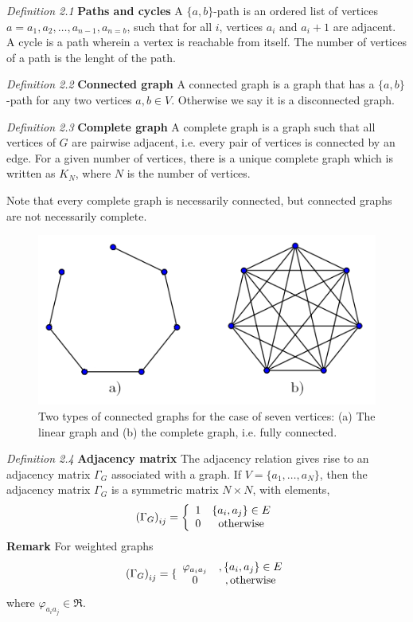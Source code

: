 \documentclass[10pt,a4paper]{book}
\numberwithin{equation}{chapter}
\numberwithin{figure}{chapter}
\numberwithin{table}{chapter}
\begin{document}
\textit{Definition 2.1} \textbf{Paths and cycles} A $\lbrace a,b \rbrace$-path is an ordered list of vertices $a=a_1,a_2,\ldots,a_{n-1},a_{n=b}$, such that for all $i$, vertices $a_i$ and $a_i+1$ are adjacent. A cycle is a path wherein a vertex is reachable from itself. The number of vertices of a path is the lenght of the path.

\textit{Definition 2.2} \textbf{Connected graph} A connected graph is a graph that has a $ \lbrace a,b \rbrace$-path for any two vertices $a,b \in V$. Otherwise we say it is a disconnected graph.

\textit{Definition 2.3} \textbf{Complete graph} A complete graph is a graph such that all vertices of $G$ are pairwise adjacent, i.e. every pair of vertices is connected by an edge. For a given number of vertices, there is a unique complete graph which is written as $K_N$, where $N$ is the number of vertices.

Note that every complete graph is necessarily connected, but connected graphs are not necessarily complete.

\begin{figure}[H]
    \begin{center}
        \includegraphics[scale=0.6]{completegraph.png}
    \end{center}
    \caption{\footnotesize Two types of connected graphs for the case of seven vertices: (a) The linear graph and (b) the complete graph, i.e. fully connected.}
    \label{complete}
\end{figure}


\textit{Definition 2.4} \textbf{Adjacency matrix} The adjacency relation gives rise to an adjacency matrix $\Gamma_G$ associated with a graph. If $V=\lbrace a_1, \ldots , a_N \rbrace$, then the adjacency matrix $\Gamma_G$ is a symmetric matrix $N\times N$, with elements,
\begin{equation}
\left( \Gamma_G\right)_{ij}=\left\lbrace \begin{array}{cc} 1 &  \lbrace a_{i},a_{j}\rbrace \in E \\ 0 & \textup{otherwise} \end{array}\right.
\end{equation}
\textbf{Remark} For weighted graphs 
\begin{equation}
\left( \Gamma_G\right)_{ij}=\lbrace \begin{array}{cc} \varphi_{a_{i}a_{j}} & , \lbrace a_{i},a_{j}\rbrace \in E \\ 0 & , \textup{otherwise} \end{array} 
\end{equation}
where $\varphi_{a_{i}a_{j}} \in \Re $.
\end{document}
